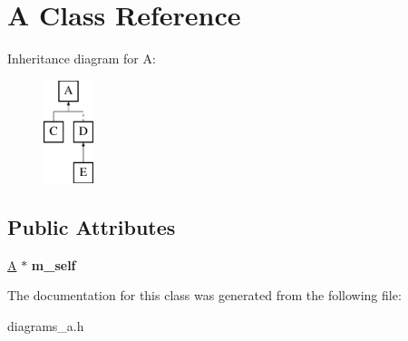 \hypertarget{class_a}{\section{A Class Reference}
\label{class_a}
}
Inheritance diagram for A\-:\begin{figure}[H]
\begin{center}
\leavevmode
\includegraphics[height=3.000000cm]{class_a}
\end{center}
\end{figure}
\subsection*{Public Attributes}
\begin{DoxyCompactItemize}
\item 
\hypertarget{class_a_a086d3a4efc697dba0601b9fef3d082ad}{\hyperlink{class_a}{A} $\ast$ {\bfseries m\-\_\-self}}\label{class_a_a086d3a4efc697dba0601b9fef3d082ad}

\end{DoxyCompactItemize}


The documentation for this class was generated from the following file\-:\begin{DoxyCompactItemize}
\item 
diagrams\-\_\-a.\-h\end{DoxyCompactItemize}
